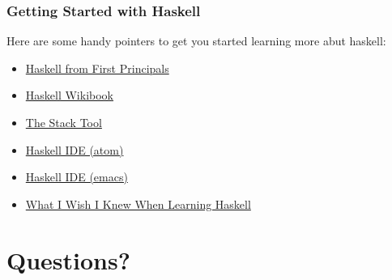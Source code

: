 \documentclass{beamer}
\begin{document}
\begin{frame}
  \frametitle{Getting Started with Haskell}
  Here are some handy pointers to get you started learning more abut
  haskell:
  \begin{itemize}
    \item \href{http://haskellbook.com}{Haskell from First Principals}
    \item \href{https://en.wikibooks.org/wiki/Haskell}{Haskell Wikibook}
    \item \href{http://haskellstack.org}{The Stack Tool}
    \item \href{https://atom.io/packages/ide-haskell}{Haskell IDE (atom)}
    \item \href{https://commercialhaskell.github.io/intero/}{Haskell IDE (emacs)}
  \item \href{http://dev.stephendiehl.com/hask/}{What I Wish I Knew When Learning Haskell}
  \end{itemize}
\end{frame}
\section{Questions?}
\end{document}
